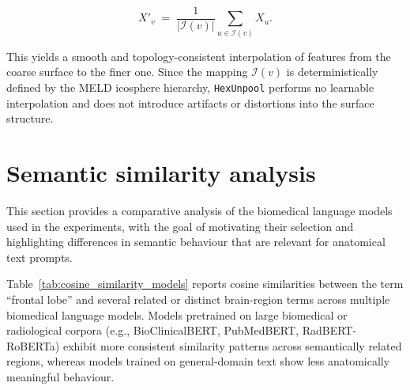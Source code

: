 \documentclass[FCD_GNN.tex]{subfiles}
\begin{document}
\[
X'_v \;=\; \frac{1}{|\mathcal{I}(v)|} 
            \sum_{u \in \mathcal{I}(v)} X_u.
\]

This yields a smooth and topology-consistent interpolation of features from the
coarse surface to the finer one. Since the mapping $\mathcal{I}(v)$ is 
deterministically defined by the MELD icosphere hierarchy, 
\texttt{HexUnpool} performs no learnable interpolation and does not introduce 
artifacts or distortions into the surface structure.

\section*{Semantic similarity analysis}
\label{sec:semantic_analysis}

This section provides a comparative analysis of the biomedical language models
used in the experiments, with the goal of motivating their selection and
highlighting differences in semantic behaviour that are relevant for
anatomical text prompts.

Table~\ref{tab:cosine_similarity_models} reports cosine similarities between
the term ``frontal lobe'' and several related or distinct brain-region terms
across multiple biomedical language models.
Models pretrained on large biomedical or radiological corpora (e.g.,
BioClinicalBERT, PubMedBERT, RadBERT-RoBERTa) exhibit more consistent similarity
patterns across semantically related regions, whereas models trained on
general-domain text show less anatomically meaningful behaviour.
\end{document}
